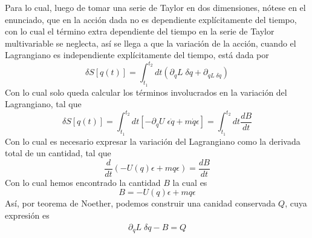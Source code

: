 \documentclass[../main.tex]{subfiles}
\begin{document}
Para lo cual, luego de tomar una serie de Taylor en dos dimensiones, nótese en el enunciado, que en la acción dada no es dependiente explícitamente del tiempo, con lo cual el término extra dependiente del tiempo en la serie de Taylor multivariable se neglecta, así se llega a que la variación de la acción, cuando el Lagrangiano es independiente explícitamente del tiempo, está dada por
\begin{equation}
  \delta S[q(t)] = \int_{t_1}^{t_2} dt \left( \partial_q L \; \delta q + \partial_{\dot{q}L \;\delta \dot{q}}  \right)
\end{equation}
Con lo cual solo queda calcular los términos involucrados en la variación del Lagrangiano, tal que
\begin{equation}
  \delta S[q(t)] = \int_{t_1}^{t_2} dt \left[ -\partial_qU\; \epsilon\dot{q} + m\dot{q}\epsilon \right] = \int_{t_1}^{t_2} dt \frac{dB}{dt}
\end{equation}
Con lo cual es necesario expresar la variación del Lagrangiano como la derivada total de un cantidad, tal que 
\begin{equation}
  \frac{d}{dt}(-U(q)\epsilon + m q \epsilon) = \frac{dB}{dt}
\end{equation}
Con lo cual hemos encontrado la cantidad $B$ la cual es
\begin{equation}
 B = -U(q)\epsilon + mq\epsilon
\end{equation}
Así, por teorema de Noether, podemos construir una canidad conservada $Q$, cuya expresión es
\begin{align*}
  \partial_{\dot{q}}L \; \delta q - B = Q 
\end{align*}
\end{document}
